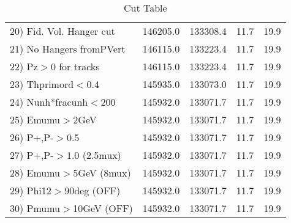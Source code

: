 \begin{table}[h!]
\begin{tabular}{||l||r|r|r|r||}
 20) Fid. Vol. Hanger cut &    146205.0 &    133308.4 &        11.7 &        19.9 \\
 21) No Hangers fromPVert &    146115.0 &    133223.4 &        11.7 &        19.9 \\
 22) Pz$>$0 for tracks    &    146115.0 &    133223.4 &        11.7 &        19.9 \\
 23) Thprimord$<$0.4      &    145935.0 &    133073.0 &        11.7 &        19.9 \\
 24) Nunh*fracunh$<$200   &    145932.0 &    133071.7 &        11.7 &        19.9 \\
 25) Emumu$>$2GeV         &    145932.0 &    133071.7 &        11.7 &        19.9 \\
 26) P+,P-$>$0.5          &    145932.0 &    133071.7 &        11.7 &        19.9 \\
 27) P+,P-$>$1.0 (2.5mux) &    145932.0 &    133071.7 &        11.7 &        19.9 \\
 28) Emumu$>$5GeV  (8mux) &    145932.0 &    133071.7 &        11.7 &        19.9 \\
 29) Phi12$>$90deg  (OFF) &    145932.0 &    133071.7 &        11.7 &        19.9 \\
 30) Pmumu$>$10GeV  (OFF) &    145932.0 &    133071.7 &        11.7 &        19.9 \\
 \hline
 \hline
 \end{tabular}
 \caption{Cut Table \cohjp  }
 \label{tab-cut__jpsi}
 \end{table}
